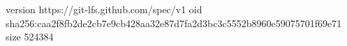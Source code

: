 version https://git-lfs.github.com/spec/v1
oid sha256:caa2f8fb2de2cb7e9cb428aa32e87d7fa2d3bc3c5552b8960e59075701f69e71
size 524384
